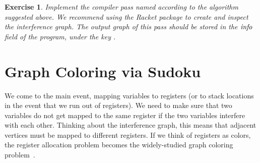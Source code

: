 \documentclass[11pt]{book}
\newcommand{\margincomment}[1]{\marginpar{#1}}
\newcommand{\margincomment}[1]{}
\newtheorem{exercise}[theorem]{Exercise}
\begin{document}

\begin{exercise}\normalfont
Implement the compiler pass named  according
to the algorithm suggested above. We recommend using the Racket
 package to create and inspect the interference graph.
The output graph of this pass should be stored in the $\mathit{info}$
field of the program, under the key .
\end{exercise}

\section{Graph Coloring via Sudoku}
\label{sec:graph-coloring}

We come to the main event, mapping variables to registers (or to stack
locations in the event that we run out of registers).  We need to make
sure that two variables do not get mapped to the same register if the
two variables interfere with each other.  Thinking about the
interference graph, this means that adjacent vertices must be mapped
to different registers.  If we think of registers as colors, the
register allocation problem becomes the widely-studied graph coloring
problem~\citep{Balakrishnan:1996ve,Rosen:2002bh}.
\end{document}
